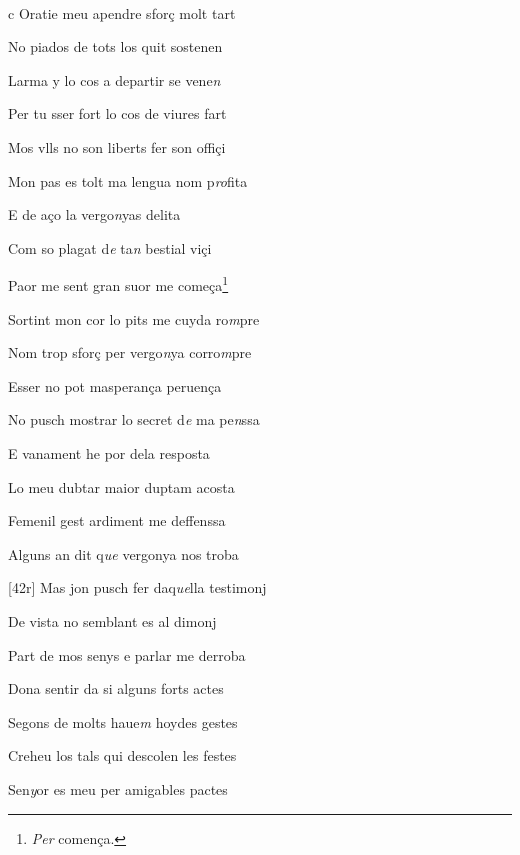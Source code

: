 \documentclass[12pt]{article}
\renewcommand{\espaiAbansEtiquetaPoema}{\vspace{0ex}}
\begin{document}
\begin{estrofa}

\espaiAbansEtiquetaPoema

\\

\end{estrofa}


\begin{estrofa}

 c Oratie meu apendre sfor\c{c} molt tart

 No piados de tots los quit sostenen

 Larma y lo cos a departir se vene\textit{n}

 Per tu sser fort lo cos de viures fart

 Mos vlls no son liberts fer son offi\c{c}i

 Mon pas es tolt ma lengua nom p\textit{ro}fita

 E de a\c{c}o la vergo\textit{n}yas delita

 Com so plagat d\textit{e} ta\textit{n} bestial vi\c{c}i

\end{estrofa}



\begin{estrofa}

 Paor me sent gran suor me come\c{c}a\footnote{\textit{Per} comen\c{c}a.}

 Sortint mon cor lo pits me cuyda ro\textit{m}pre

 Nom trop sfor\c{c} per vergo\textit{n}ya corro\textit{m}pre

 Esser no pot masperan\c{c}a peruen\c{c}a

 No pusch mostrar lo secret d\textit{e} ma pe\textit{n}ssa

 E vanament he por dela resposta

 Lo meu dubtar maior duptam acosta

 Femenil gest ardiment me deffenssa

\end{estrofa}



\begin{estrofa}

 Alguns an dit q\textit{ue} vergonya nos troba

 [42r] Mas jon pusch fer daq\textit{ue}lla testimonj

 De vista no semblant es al dimonj

 Part de mos senys e parlar me derroba

 Dona sentir da si alguns forts actes

 Segons de molts haue\textit{m} hoydes gestes

 Creheu los tals qui descolen les festes

 Sen\textit{y}or es meu per amigables pactes

\end{estrofa}
\end{document}
